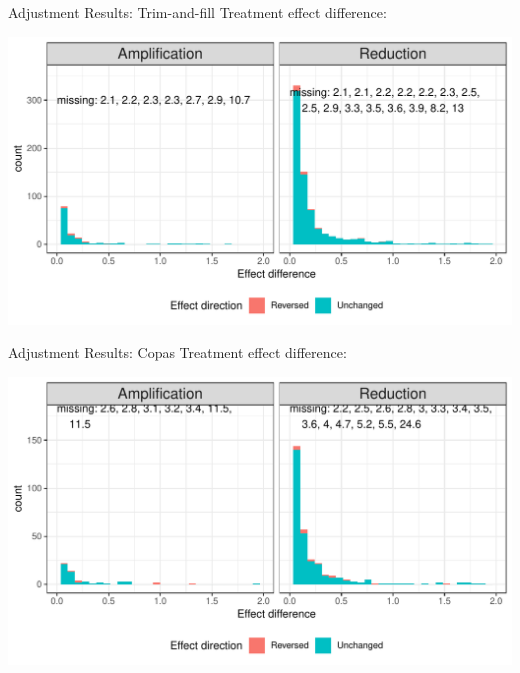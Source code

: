 \documentclass[english]{beamer}\usepackage[]{graphicx}\usepackage[]{color}
\makeatletter
\def\maxwidth{ %
  \ifdim\Gin@nat@width>\linewidth
    \linewidth
  \else
    \Gin@nat@width
  \fi
}
\newenvironment{knitrout}{}{} %
\makeatother
\begin{document}

\begin{frame}[fragile]{Adjustment Results: Trim-and-fill}
Treatment effect difference:

\vspace{-3mm}
\begin{knitrout}
\color{fgcolor}
\includegraphics[width=\maxwidth]{figure/unnamed-chunk-23-1} 

\end{knitrout}
\end{frame}


\begin{frame}[fragile]{Adjustment Results: Copas}
Treatment effect difference:

\vspace{-3mm}
\begin{knitrout}
\color{fgcolor}
\includegraphics[width=\maxwidth]{figure/unnamed-chunk-24-1} 

\end{knitrout}
\end{frame}
\end{document}
